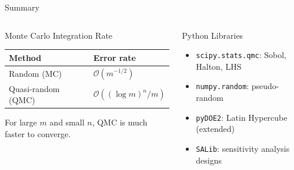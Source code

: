 \documentclass[aspectratio=169,10pt]{beamer}
\begin{document}
\begin{frame}[allowframebreaks]{Summary}
  \framebreak

  \begin{columns}
    \begin{block}{Monte Carlo Integration Rate}
      \begin{tabular}{ll}
        \toprule
        Method & Error rate \\
        \midrule
        Random (MC) & $\mathcal{O}(m^{-1/2})$ \\
        Quasi-random (QMC) & $\mathcal{O}((\log m)^n / m)$ \\
        \bottomrule
      \end{tabular}
      \vspace{0.3em}

      For large $m$ and small $n$, QMC is much faster to converge.
    \end{block}

    \begin{block}{Python Libraries}
      \begin{itemize}
        \item \texttt{scipy.stats.qmc}: Sobol, Halton, LHS
        \item \texttt{numpy.random}: pseudo-random
        \item \texttt{pyDOE2}: Latin Hypercube (extended)
        \item \texttt{SALib}: sensitivity analysis designs
      \end{itemize}
    \end{block}
  \end{columns}
\end{frame}
\end{document}
